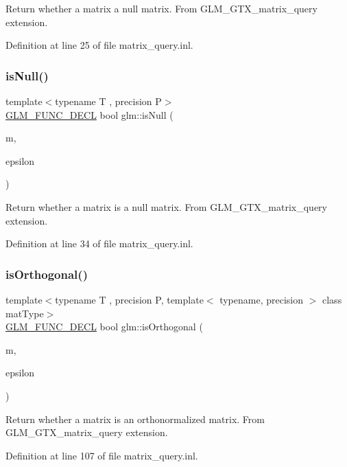 Return whether a matrix a null matrix. From G\+L\+M\+\_\+\+G\+T\+X\+\_\+matrix\+\_\+query extension. 

Definition at line 25 of file matrix\+\_\+query.\+inl.

\mbox{\label{group__gtx__matrix__query_ga5b8d7b0c7bf1d48ff8df10321440a61a}} 
\subsubsection{\texorpdfstring{is\+Null()}{isNull()}\hspace{0.1cm}{\footnotesize\ttfamily [3/3]}}
{\footnotesize\ttfamily template$<$typename T , precision P$>$ \\
\hyperlink{setup_8hpp_ab2d052de21a70539923e9bcbf6e83a51}{G\+L\+M\+\_\+\+F\+U\+N\+C\+\_\+\+D\+E\+CL} bool glm\+::is\+Null (\begin{DoxyParamCaption}\item[{\hyperlink{structglm_1_1detail_1_1tmat4x4}{detail\+::tmat4x4}$<$ T, P $>$ const \&}]{m,  }\item[{T const \&}]{epsilon }\end{DoxyParamCaption})}

Return whether a matrix is a null matrix. From G\+L\+M\+\_\+\+G\+T\+X\+\_\+matrix\+\_\+query extension. 

Definition at line 34 of file matrix\+\_\+query.\+inl.

\mbox{\label{group__gtx__matrix__query_gab2cb5d23df77b4e4e63ad2965acd31b3}} 
\subsubsection{\texorpdfstring{is\+Orthogonal()}{isOrthogonal()}}
{\footnotesize\ttfamily template$<$typename T , precision P, template$<$ typename, precision $>$ class mat\+Type$>$ \\
\hyperlink{setup_8hpp_ab2d052de21a70539923e9bcbf6e83a51}{G\+L\+M\+\_\+\+F\+U\+N\+C\+\_\+\+D\+E\+CL} bool glm\+::is\+Orthogonal (\begin{DoxyParamCaption}\item[{mat\+Type$<$ T, P $>$ const \&}]{m,  }\item[{T const \&}]{epsilon }\end{DoxyParamCaption})}

Return whether a matrix is an orthonormalized matrix. From G\+L\+M\+\_\+\+G\+T\+X\+\_\+matrix\+\_\+query extension. 

Definition at line 107 of file matrix\+\_\+query.\+inl.

